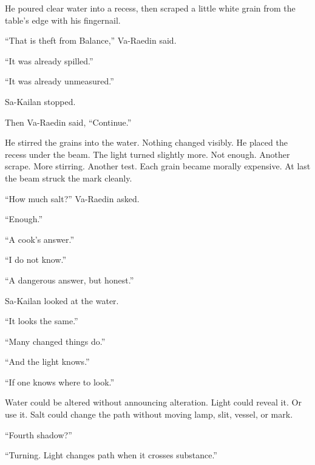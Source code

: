 He poured clear water into a recess, then scraped a little white grain from the table’s edge with his fingernail.\par

“That is theft from Balance,” Va-Raedin said.\par

“It was already spilled.”\par

“It was already unmeasured.”\par

Sa-Kailan stopped.\par

Then Va-Raedin said, “Continue.”\par

He stirred the grains into the water.
Nothing changed visibly.
He placed the recess under the beam.
The light turned slightly more.
Not enough.
Another scrape.
More stirring.
Another test.
Each grain became morally expensive.
At last the beam struck the mark cleanly.\par

“How much salt?” Va-Raedin asked.\par

“Enough.”\par

“A cook’s answer.”\par

“I do not know.”\par

“A dangerous answer, but honest.”\par

Sa-Kailan looked at the water.\par

“It looks the same.”\par

“Many changed things do.”\par

“And the light knows.”\par

“If one knows where to look.”\par

Water could be altered without announcing alteration.
Light could reveal it.
Or use it.
Salt could change the path without moving lamp, slit, vessel, or mark.\par

“Fourth shadow?”\par

“Turning.
Light changes path when it crosses substance.”\par

